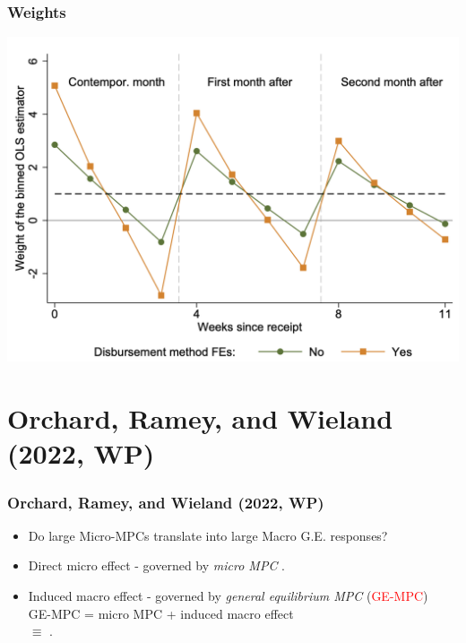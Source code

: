 \documentclass[english,xcolor=svgnames]{beamer}
\begin{document}
\begin{frame}
\frametitle[alignment=center]{Weights}
\centering
\includegraphics[scale=0.5]{figures/BJSFIG3.png}
\end{frame}

\section{Orchard, Ramey, and Wieland (2022, WP)}

\begin{frame}
\frametitle[alignment=center]{Orchard, Ramey, and Wieland (2022, WP)}
\begin{itemize}
	\item Do large Micro-MPCs translate into large Macro G.E. responses?
	\item Direct micro effect - governed by \textit{micro MPC} .
\item Induced macro effect - governed by \textit{general equilibrium MPC} (\textcolor{red}{GE-MPC}) \hspace{.05in} \\ \vspace{.2in}
\indent GE-MPC \hspace{.05in} = \hspace{.05in} micro MPC \hspace{.05in} + \hspace{.05in} induced macro effect \hspace{.05in} \\ \medskip
\indent \hspace{0.62in}  $\equiv$ \hspace{.05in} .
\end{itemize}


\end{frame}
\end{document}
